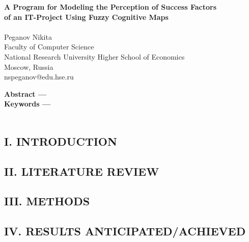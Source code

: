 \documentclass{article}
\begin{document}
    \thispagestyle{empty}
    \begin{center}
        \fontsize{18}{20}\selectfont
        \textbf{
        A Program for Modeling the Perception of Success Factors\\
        of an IT-Project Using Fuzzy Cognitive Maps\\
        }
        ~\\
        \fontsize{14}{16}\selectfont
        Peganov Nikita\\
        Faculty of Computer Science\\
        National Research University Higher School of Economics\\
        Moscow, Russia\\
        nspeganov@edu.hse.ru\\
    \end{center}
    \bigskip
    \begin{minipage}{0.4\textwidth}
        \textbf{Abstract —}\\
        \textbf{Keywords —}\\
        ~\\
        \begin{center}
            \chapter{I. INTRODUCTION}
        \end{center}
        \lipsum[3-4]
    \end{minipage}
    \hfill
    \begin{minipage}{0.4\textwidth}
        \begin{center}
            \chapter{II. LITERATURE REVIEW}
        \end{center}
        \lipsum[3-4]
    \end{minipage}
\newpage
    \begin{minipage}{0.4\textwidth}
        \begin{center}
            \chapter{III. METHODS}
        \end{center}
        \lipsum[2-4]
    \end{minipage}
    \hfill
    \begin{minipage}{0.4\textwidth}
        \begin{center}
            \chapter{IV. RESULTS ANTICIPATED/ACHIEVED}
        \end{center}
        \lipsum[2-4]
    \end{minipage}
\end{document}
